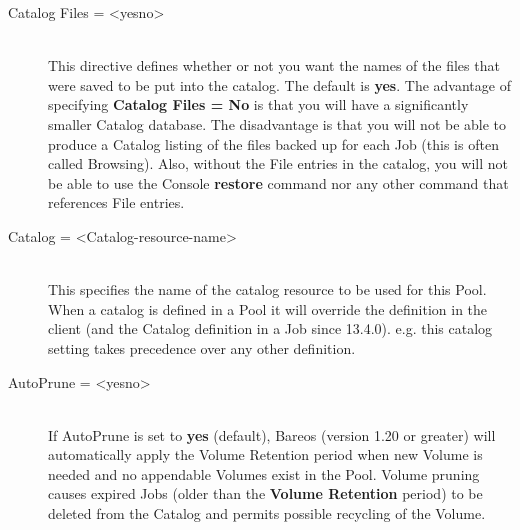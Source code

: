 \begin{description}
\item [Catalog Files = {\textless}yes{\textbar}no{\textgreater}] \hfill \\
This directive defines whether or not you want the names of the files
that were saved to be put into the catalog.  The default is {\bf yes}.
The advantage of specifying {\bf Catalog Files = No} is that you will
have a significantly smaller Catalog database.  The disadvantage is that
you will not be able to produce a Catalog listing of the files backed up
for each Job (this is often called Browsing).  Also, without the File
entries in the catalog, you will not be able to use the Console {\bf
restore} command nor any other command that references File entries.

\item [Catalog = {\textless}Catalog-resource-name{\textgreater}] \hfill \\
This specifies the name of the catalog resource to be used for this Pool.
When a catalog is defined in a Pool it will override the definition in
the client (and the Catalog definition in a Job since 13.4.0). e.g.
this catalog setting takes precedence over any other definition.

\label{PoolAutoPrune}
\item [AutoPrune = {\textless}yes{\textbar}no{\textgreater}] \hfill \\
If AutoPrune is set to {\bf yes} (default), Bareos (version 1.20 or
greater) will automatically apply the Volume Retention period when new
Volume is needed and no appendable Volumes exist in the Pool.  Volume
pruning causes expired Jobs (older than the {\bf Volume Retention}
period) to be deleted from the Catalog and permits possible recycling of
the Volume.


\end{description}
